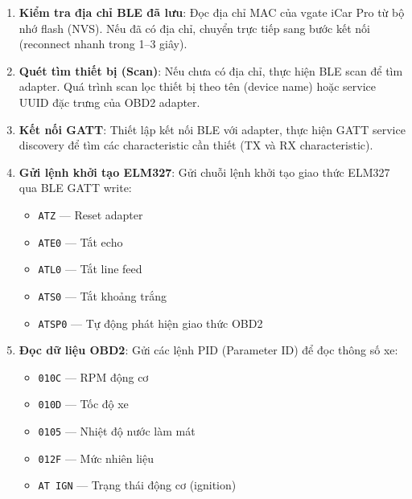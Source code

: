 \documentclass[a4paper]{extarticle}
\providecommand{\tightlist}{%
  \setlength{\itemsep}{0pt}\setlength{\parskip}{0pt}}
\begin{document}
\begin{enumerate}
\def\labelenumi{\arabic{enumi}.}
\item
  \textbf{Kiểm tra địa chỉ BLE đã lưu}: Đọc địa chỉ MAC của vgate iCar
  Pro từ bộ nhớ flash (NVS). Nếu đã có địa chỉ, chuyển trực tiếp sang
  bước kết nối (reconnect nhanh trong 1--3 giây).
\item
  \textbf{Quét tìm thiết bị (Scan)}: Nếu chưa có địa chỉ, thực hiện BLE
  scan để tìm adapter. Quá trình scan lọc thiết bị theo tên (device
  name) hoặc service UUID đặc trưng của OBD2 adapter.
\item
  \textbf{Kết nối GATT}: Thiết lập kết nối BLE với adapter, thực hiện
  GATT service discovery để tìm các characteristic cần thiết (TX và RX
  characteristic).
\item
  \textbf{Gửi lệnh khởi tạo ELM327}: Gửi chuỗi lệnh khởi tạo giao thức
  ELM327 qua BLE GATT write:

  \begin{itemize}
  \tightlist
  \item
    \texttt{ATZ} --- Reset adapter
  \item
    \texttt{ATE0} --- Tắt echo
  \item
    \texttt{ATL0} --- Tắt line feed
  \item
    \texttt{ATS0} --- Tắt khoảng trắng
  \item
    \texttt{ATSP0} --- Tự động phát hiện giao thức OBD2
  \end{itemize}
\item
  \textbf{Đọc dữ liệu OBD2}: Gửi các lệnh PID (Parameter ID) để đọc
  thông số xe:

  \begin{itemize}
  \tightlist
  \item
    \texttt{010C} --- RPM động cơ
  \item
    \texttt{010D} --- Tốc độ xe
  \item
    \texttt{0105} --- Nhiệt độ nước làm mát
  \item
    \texttt{012F} --- Mức nhiên liệu
  \item
    \texttt{AT\ IGN} --- Trạng thái động cơ (ignition)
  \end{itemize}
\end{enumerate}
\end{document}
